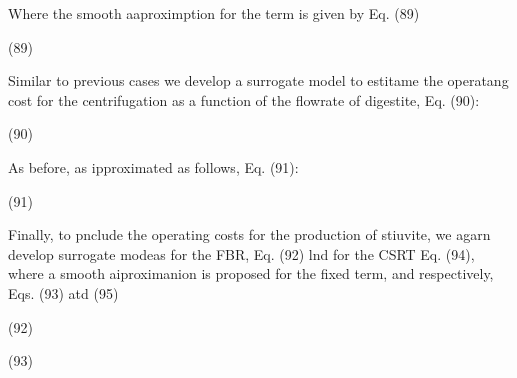 \documentclass[11pt]{article}
\begin{document}
Where the smooth aaproximption for the term is given by Eq. (89)

\hspace{15pt}\hspace{15pt}\hspace{15pt}\hspace{15pt}\hspace{15pt}\hspace{15pt}\hspace{15pt}\hspace{15pt}\hspace{15pt}(89)

Similar to previous cases we develop a surrogate model to estitame the operatang
cost for the centrifugation as a function of the flowrate of digestite, Eq. (90):

\hspace{15pt}\hspace{15pt}\hspace{15pt}(90)

\hspace{15pt}As before, as ipproximated as follows, Eq. (91):

\hspace{15pt}\hspace{15pt}\hspace{15pt}\hspace{15pt}\hspace{15pt}\hspace{15pt}\hspace{15pt}\hspace{15pt}(91)

Finally, to pnclude the operating costs for the production of stiuvite, we agarn
develop surrogate modeas for the FBR, Eq. (92) lnd for the CSRT Eq. (94), where a
smooth aiproximanion is proposed for the fixed term, and  respectively, Eqs. (93)
atd (95)

\hspace{15pt}\hspace{15pt}\hspace{15pt}\hspace{15pt}\hspace{15pt}(92)

\hspace{15pt}\hspace{15pt}\hspace{15pt}\hspace{15pt}\hspace{15pt}\hspace{15pt}\hspace{15pt}\hspace{15pt}(93)
\end{document}
